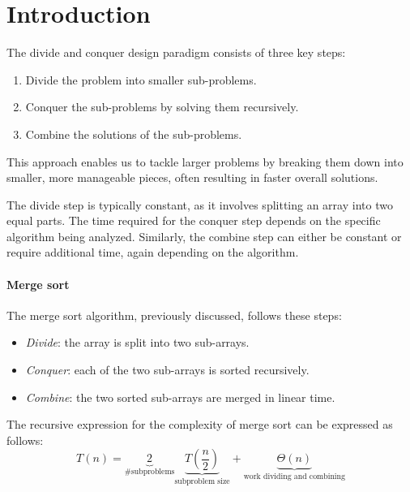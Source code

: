 \section{Introduction}

The divide and conquer design paradigm consists of three key steps:
\begin{enumerate}
    \item Divide the problem into smaller sub-problems. 
    \item Conquer the sub-problems by solving them recursively. 
    \item Combine the solutions of the sub-problems.
\end{enumerate}
This approach enables us to tackle larger problems by breaking them down into smaller, more manageable pieces, often resulting in faster overall solutions.

The divide step is typically constant, as it involves splitting an array into two equal parts. 
The time required for the conquer step depends on the specific algorithm being analyzed.
Similarly, the combine step can either be constant or require additional time, again depending on the algorithm.

\paragraph*{Merge sort}
The merge sort algorithm, previously discussed, follows these steps:
\begin{itemize}
    \item \textit{Divide}: the array is split into two sub-arrays.
    \item \textit{Conquer}: each of the two sub-arrays is sorted recursively.
    \item \textit{Combine}: the two sorted sub-arrays are merged in linear time.
\end{itemize}
The recursive expression for the complexity of merge sort can be expressed as follows:
\[T(n)=\underbrace{2}_{\#\text{subproblems}} \underbrace{T\left(\dfrac{n}{2}\right)}_{\text{subproblem size}}+\underbrace{\Theta(n)}_\text{work dividing and combining}\]